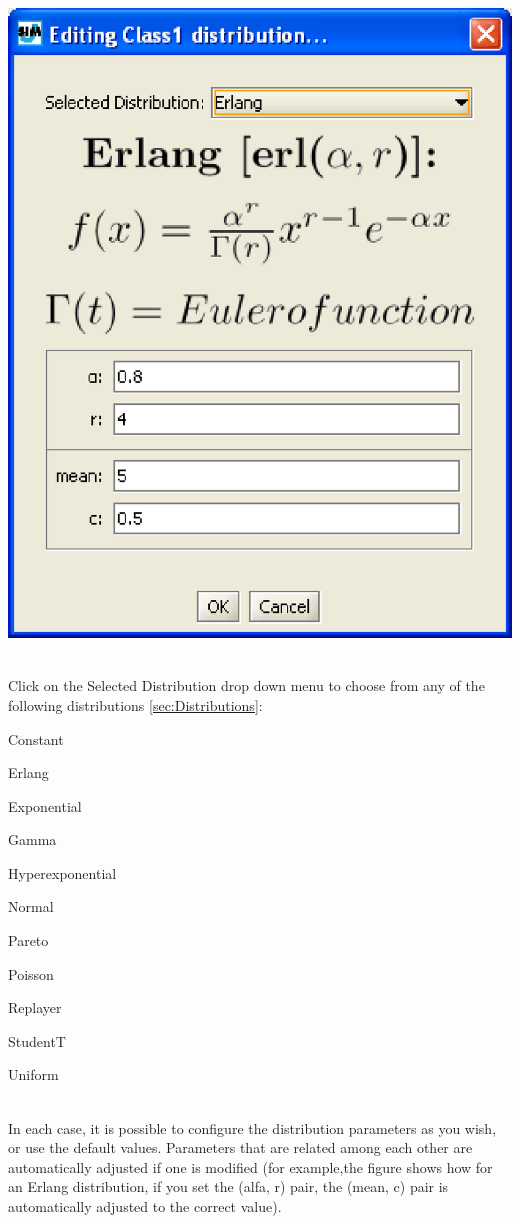 \begin{center}
\includegraphics[scale=.5]{img/jsim/erlang.eps}
\end{center}\\
Click on the Selected Distribution drop down menu to choose from any of the following distributions \ref{sec:Distributions}:
\begin{itemize*}
	\item Constant
	\item Erlang
	\item Exponential
	\item Gamma 
	\item Hyperexponential
	\item Normal 
	\item Pareto 
	\item Poisson 
	\item Replayer 
	\item StudentT 
	\item Uniform 
\end{itemize*}\\
In each case, it is possible to configure the distribution parameters as you wish, or use the default values. Parameters that are related among each other are automatically adjusted if one is modified (for example,the figure shows how for an Erlang distribution, if you set the (alfa, r) pair, the (mean, c) pair is automatically adjusted to the correct value).
